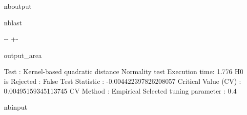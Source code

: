\documentclass[letterpaper,10pt,english,openany,oneside]{sphinxmanual}
\begin{document}
\begin{sphinxuseclass}{nboutput}
\begin{sphinxuseclass}{nblast}
{

\kern-\sphinxverbatimsmallskipamount\kern-\baselineskip
\kern+\FrameHeightAdjust\kern-\fboxrule
\vspace{\nbsphinxcodecellspacing}

\begin{sphinxuseclass}{output_area}
\begin{sphinxuseclass}{}


\begin{sphinxVerbatim}[commandchars=\\\{\}]
Test : Kernel-based quadratic distance Normality test
Execution time: 1.776
H0 is Rejected : False
Test Statistic : -0.004422397826208057
Critical Value (CV) : 0.00495159345113745
CV Method : Empirical
Selected tuning parameter : 0.4
\end{sphinxVerbatim}



\end{sphinxuseclass}
\end{sphinxuseclass}
}

\end{sphinxuseclass}
\end{sphinxuseclass}
\begin{sphinxuseclass}{nbinput}
{
\begin{sphinxVerbatim}[commandchars=\\\{\}]
\llap{\color{nbsphinxin}[3]:\,\hspace{\fboxrule}\hspace{\fboxsep}}
\end{sphinxVerbatim}
}

\end{sphinxuseclass}
\end{document}
